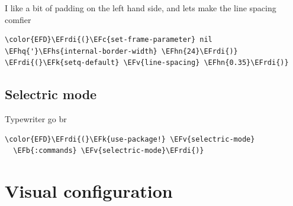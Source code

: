 \documentclass{scrartcl}
\newcommand{\EFk}[1]{\textcolor{EFk}{#1}} %
\newcommand{\EFb}[1]{\textcolor{EFb}{#1}} %
\newcommand{\EFc}[1]{\textcolor{EFc}{#1}} %
\newcommand{\EFv}[1]{\textcolor{EFv}{#1}} %
\newcommand{\EFhn}[1]{\textcolor{EFhn}{\textbf{#1}}} %
\newcommand{\EFhq}[1]{\textcolor{EFhq}{#1}} %
\newcommand{\EFhs}[1]{\textcolor{EFhs}{#1}} %
\newcommand{\EFrdi}[1]{\textcolor{EFrdi}{#1}} %
\begin{document}
I like a bit of padding on the left hand side, and lets make the line spacing comfier
\begin{Code}
\begin{Verbatim}[]
\color{EFD}\EFrdi{(}\EFc{set-frame-parameter} nil \EFhq{'}\EFhs{internal-border-width} \EFhn{24}\EFrdi{)}
\EFrdi{(}\EFk{setq-default} \EFv{line-spacing} \EFhn{0.35}\EFrdi{)}
\end{Verbatim}
\end{Code}

\subsection{Selectric mode}
\label{sec:orga74b669}
Typewriter go br
\begin{Code}
\begin{Verbatim}[]
\color{EFD}\EFrdi{(}\EFk{use-package!} \EFv{selectric-mode}
  \EFb{:commands} \EFv{selectric-mode}\EFrdi{)}
\end{Verbatim}
\end{Code}

\section{Visual configuration}
\label{sec:orge16af90}
\end{document}
